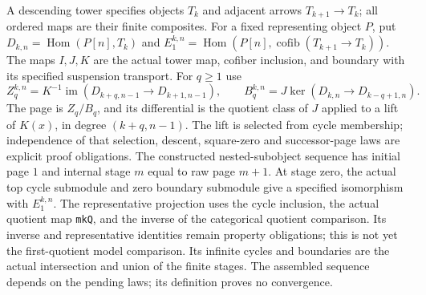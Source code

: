 \begin{definition}
  \label{def:represented-tower-sequence}
  \notready
  A descending tower specifies objects $T_k$ and adjacent arrows
  $T_{k+1}\to T_k$; all ordered maps are their finite composites.
  For a fixed representing object $P$, put
  $D_{k,n}=\operatorname{Hom}(P[n],T_k)$ and
  $E_1^{k,n}=\operatorname{Hom}(P[n],\operatorname{cofib}(T_{k+1}\to T_k))$.
  The maps $I,J,K$ are the actual tower map, cofiber inclusion, and boundary
  with its specified suspension transport. For $q\ge1$ use
  \[
    Z_q^{k,n}=K^{-1}\operatorname{im}(D_{k+q,n-1}\to D_{k+1,n-1}),
    \qquad
    B_q^{k,n}=J\ker(D_{k,n}\to D_{k-q+1,n}).
  \]
  The page is $Z_q/B_q$, and its differential is the quotient class of
  $J$ applied to a lift of $K(x)$, in degree $(k+q,n-1)$.
  The lift is selected from cycle membership; independence of that selection,
  descent, square-zero and successor-page laws are explicit proof obligations.
  The constructed nested-subobject sequence has initial page $1$ and internal
  stage $m$ equal to raw page $m+1$. At stage zero, the actual top cycle
  submodule and zero boundary submodule give a specified isomorphism with
  $E_1^{k,n}$. The representative projection uses the cycle inclusion,
  the actual quotient map \texttt{mkQ}, and the inverse of the categorical
  quotient comparison. Its inverse and representative identities remain
  property obligations; this is not yet the first-quotient model comparison.
  Its infinite cycles and boundaries are
  the actual intersection and union of the finite stages. The assembled
  sequence depends on the pending laws; its definition proves no convergence.
\end{definition}

